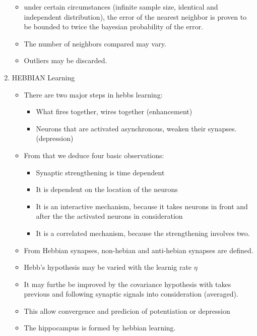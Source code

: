 \documentclass{scrartcl}
\begin{document}
\begin{enumerate}
\begin{itemize}
	\item under certain circumstances (infinite sample size, identical and independent distribution), the error of the nearest neighbor is proven to be bounded to twice the bayesian probability of the error.
	\item The number of neighbors compared may vary.
	\item Outliers may be discarded.
	\end{itemize}
	
\item HEBBIAN Learning
	\begin{itemize}
	\item There are two major steps in hebbs learning:
		\begin{itemize}
			\item What fires together, wires together (enhancement)
			\item Neurons that are activated asynchronous, weaken their synapses. (depression)
		\end{itemize}
		\item From that we deduce four basic observations:
			\begin{itemize}
			\item Synaptic strengthening is time dependent
			\item It is dependent on the location of the neurons
			\item It is an interactive mechanism, because it takes neurons in front and after the the activated neurons in consideration
			\item It is a correlated mechanism, because the strengthening involves two. 
			\end{itemize}
		\item From Hebbian synapses, non-hebian and anti-hebian synapses are defined.
		\item Hebb's hypothesis may be varied with the learnig rate $\eta$
		\item It may furthe be improved by the covariance hypothesis with takes previous and following synaptic signals into consideration (averaged).
		\item This allow convergence and predicion of potentiation or depression
		\item The hippocampus is formed by hebbian learning. 
	\end{itemize}
	

\end{enumerate}
\end{document}
